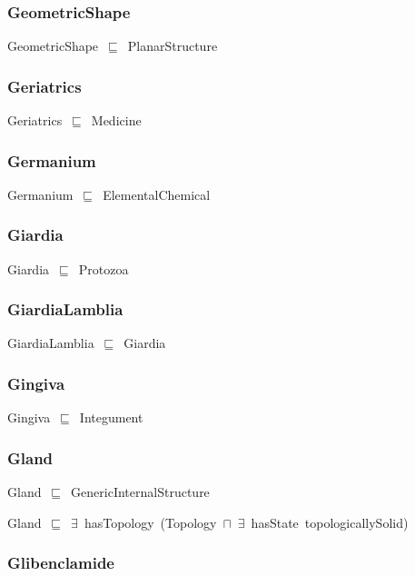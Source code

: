 \documentclass{article}
\begin{document}
\subsubsection*{GeometricShape}

GeometricShape~\ensuremath{\sqsubseteq}~PlanarStructure~

\subsubsection*{Geriatrics}

Geriatrics~\ensuremath{\sqsubseteq}~Medicine~

\subsubsection*{Germanium}

Germanium~\ensuremath{\sqsubseteq}~ElementalChemical~

\subsubsection*{Giardia}

Giardia~\ensuremath{\sqsubseteq}~Protozoa~

\subsubsection*{GiardiaLamblia}

GiardiaLamblia~\ensuremath{\sqsubseteq}~Giardia~

\subsubsection*{Gingiva}

Gingiva~\ensuremath{\sqsubseteq}~Integument~

\subsubsection*{Gland}

Gland~\ensuremath{\sqsubseteq}~GenericInternalStructure~

Gland~\ensuremath{\sqsubseteq}~\ensuremath{\exists}~hasTopology~(Topology~\ensuremath{\sqcap}~\ensuremath{\exists}~hasState~topologicallySolid)~

\subsubsection*{Glibenclamide}
\end{document}
